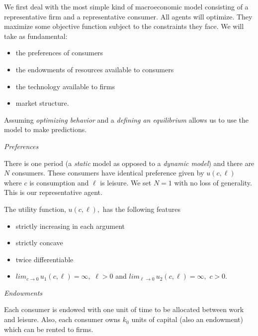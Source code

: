 \documentclass{sebase}
\begin{document}
\SetTitle{}
\SetCourse{}
\SetAuthor{}
\SetDate{}
\TitlePage{}

\setcounter{page}{1}

We first deal with the most simple kind of macroeconomic model consisting of
a representative firm and a representative consumer. All agents will
optimize. They maximize some objective function subject to the constraints
they face. We will take as fundamental:

\begin{itemize}
\item the preferences of consumers

\item the endowments of resources available to consumers

\item the technology available to firms

\item market structure.
\end{itemize}

Assuming \textit{optimizing behavior} and a \textit{defining an equilibrium}
allows us to use the model to make predictions.

\textit{Preferences}

There is one period (a \textit{static} model as opposed to a \textit{dynamic
model}) and there are $N$ consumers. These consumers have identical
preference given by $u(c,\ell )$ where $c$ is consumption and $\ell $ is
leisure. We set $N=1$ with no loss of generality. This is our representative
agent.

\pagebreak

The utility function, $u(c,\ell ),$ has the following features

\begin{itemize}
\item strictly increasing in each argument

\item strictly concave

\item twice differentiable

\item $lim_{c\rightarrow 0}\,u_{1}(c,\ell )=\infty ,$ $\ell >0$ and $%
lim_{\ell \rightarrow 0}\,u_{2}(c,\ell )=\infty ,$ $c>0.$
\end{itemize}

\textit{Endowments}

Each consumer is endowed with one unit of time to be allocated between work
and leisure. Also, each consumer owns $k_{0}$ units of capital (also an
endowment) which can be rented to firms.
\end{document}
